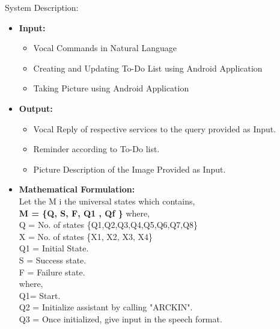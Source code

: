 \documentclass[16pt,oneside,a4paper]{article}
\begin{document}
System Description:
\begin{itemize} 
\item \textbf{Input:}	 
	\begin{itemize}
		\item Vocal Commands in Natural Language
		\item Creating and Updating To-Do List using Android Application
		\item Taking Picture using Android Application
	\end{itemize} 
\item \textbf{Output:}
	\begin{itemize}
		\item Vocal Reply of respective services to the query provided as Input.
		\item Reminder according to To-Do list.
		\item Picture Description of the Image Provided as Input.
	\end{itemize}	 
\item \textbf{Mathematical Formulation:}\\
Let the M i the universal states which contains, \\
    \textbf{M = \{Q, S, F, Q1 , Qf \}} \newline
    where, \\
    \newline
    		Q = No. of states \{Q1,Q2,Q3,Q4,Q5,Q6,Q7,Q8\}\\
    		X = No. of states \{X1, X2, X3, X4\}\\
    		Q1 = Initial State.\\
    		S = Success state.\\
    		F = Failure state.\\
    		\newline
    where,\\ 
    \newline
    Q1= Start.\\
     \newline
    Q2 = Initialize assistant by calling "ARCKIN". \\
    \newline
    Q3 = Once initialized, give input in the speech format.\\

\end{itemize}
\end{document}
